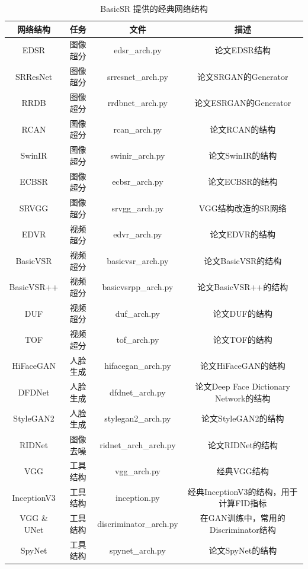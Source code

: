\documentclass[../main.tex]{subfiles}
\begin{document}
    \begin{table}[h]
    \centering
    {
    \begin{tabular}{|c|c|c|c|}
    \hline
    \textbf{网络结构} & \textbf{任务} & \textbf{文件} & \textbf{描述} \\ \hline
    EDSR & 图像超分 & edsr\_arch.py & 论文EDSR结构 \\ \hline
    SRResNet & 图像超分 & srresnet\_arch.py & 论文SRGAN的Generator \\ \hline
    RRDB & 图像超分 & rrdbnet\_arch.py & 论文ESRGAN的Generator \\ \hline
    RCAN & 图像超分 & rcan\_arch.py & 论文RCAN的结构 \\ \hline
    SwinIR & 图像超分 & swinir\_arch.py & 论文SwinIR的结构 \\ \hline
    ECBSR & 图像超分 & ecbsr\_arch.py & 论文ECBSR的结构 \\ \hline
    SRVGG & 图像超分 & srvgg\_arch.py & VGG结构改造的SR网络 \\ \hline
    EDVR & 视频超分 & edvr\_arch.py & 论文EDVR的结构 \\ \hline
    BasicVSR & 视频超分 & basicvsr\_arch.py &  论文BasicVSR的结构\\ \hline
    BasicVSR++ & 视频超分 & basicvsrpp\_arch.py &  论文BasicVSR++的结构\\ \hline
    DUF & 视频超分 & duf\_arch.py &  论文DUF的结构\\ \hline
    TOF & 视频超分 & tof\_arch.py &  论文TOF的结构\\ \hline
    HiFaceGAN & 人脸生成 & hifacegan\_arch.py &  论文HiFaceGAN的结构\\ \hline
    DFDNet & 人脸生成 & dfdnet\_arch.py &  论文Deep Face Dictionary Network的结构\\ \hline
    StyleGAN2  & 人脸生成 & stylegan2\_arch.py &  论文StyleGAN2的结构 \\ \hline
    RIDNet  & 图像去噪 & ridnet\_arch\_arch.py &  论文RIDNet的结构 \\ \hline
    VGG  & 工具结构 & vgg\_arch.py &  经典VGG结构 \\ \hline
    InceptionV3  & 工具结构 & inception.py &  经典InceptionV3的结构，用于计算FID指标 \\ \hline
    VGG \& UNet  & 工具结构 & discriminator\_arch.py &  在GAN训练中，常用的Discriminator结构 \\ \hline
    SpyNet  & 工具结构 & spynet\_arch.py &  论文SpyNet的结构 \\ \hline
    \end{tabular}
    }
    \caption{BasicSR 提供的经典网络结构}
    \end{table}
\end{document}
